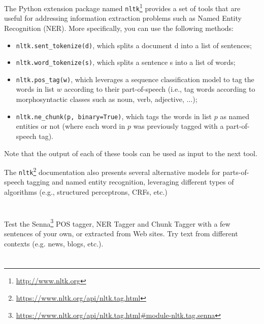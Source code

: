 \documentclass[12pt]{article}
\begin{document}

The Python extension package named \verb+nltk+\footnote{\url{http://www.nltk.org}} provides a set of tools that are useful for addressing information extraction problems such as Named Entity Recognition (NER). More specifically, you can use the following methods:

\begin{itemize}
\item \verb+nltk.sent_tokenize(d)+, which splits a document d into a list of sentences;

\item \verb+nltk.word_tokenize(s)+, which splits a sentence s into a list of words;

\item \verb+nltk.pos_tag(w)+, which leverages a sequence classification model to tag the words in list $w$ according to their part-of-speech (i.e., tag words according to morphosyntactic classes such as noun, verb, adjective, $\ldots$);

\item \verb+nltk.ne_chunk(p, binary=True)+, which tags the words in list $p$ as named entities or not (where each word in $p$ was previously tagged with a part-of-speech tag).
\end{itemize}

Note that the output of each of these tools can be used as input to the next tool.

The \verb+nltk+\footnote{\url{https://www.nltk.org/api/nltk.tag.html}} documentation also presents several alternative models for parts-of-speech tagging and named entity recognition, leveraging different types of algorithms (e.g., structured perceptrons, CRFs, etc.)

\section{}

Test the Senna\footnote{\url{https://www.nltk.org/api/nltk.tag.html#module-nltk.tag.senna}} POS tagger, NER Tagger and Chunk Tagger with a few sentences of your own, or extracted from Web sites. Try text from different contexts (e.g. news, blogs, etc.).

\section{}
\end{document}

